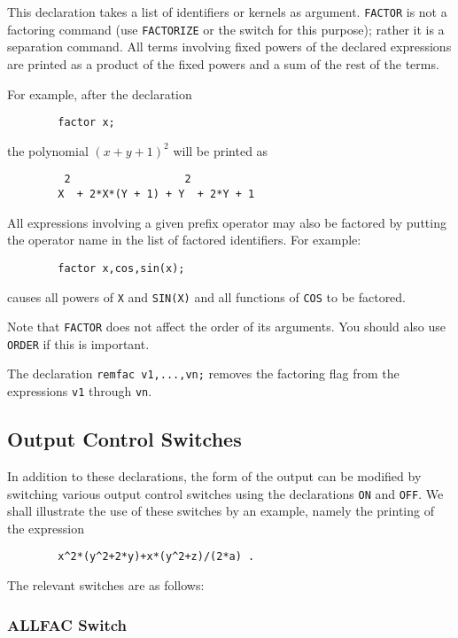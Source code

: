 This declaration takes a list of identifiers or kernels
as argument. \texttt{FACTOR} is not a factoring command
(use \texttt{FACTORIZE} or the  switch for this purpose); rather it
is a separation command.  All terms involving fixed powers of the declared
expressions are printed as a product of the fixed powers and a sum of the
rest of the terms.

For example, after the declaration
\begin{verbatim}
        factor x;
\end{verbatim}
the polynomial $(x+y+1)^{2}$ will be printed as
\begin{verbatim}
         2                  2
        X  + 2*X*(Y + 1) + Y  + 2*Y + 1
\end{verbatim}
All expressions involving a given prefix operator may also be factored by
putting the operator name in the list of factored identifiers. For example:
\begin{verbatim}
        factor x,cos,sin(x);
\end{verbatim}
causes all powers of \texttt{X} and \texttt{SIN(X)} and all functions of
\texttt{COS} to be factored.

Note that \texttt{FACTOR} does not affect the order of its arguments.  You
should also use \texttt{ORDER} if this is important.

\hypertarget{command:REMFAC}{}
The declaration \texttt{remfac v1,...,vn;} removes the
factoring flag from the expressions \texttt{v1} through \texttt{vn}.

\subsection{Output Control Switches}
\label{sec-output}
In addition to these declarations, the form of the output can be modified
by switching various output control switches using the declarations
\texttt{ON} and \texttt{OFF}.  We shall illustrate the use of these switches by an
example, namely the printing of the expression
\begin{verbatim}
        x^2*(y^2+2*y)+x*(y^2+z)/(2*a) .
\end{verbatim}
The relevant switches are as follows:

\subsubsection{ALLFAC Switch}
\hypertarget{switch:ALLFAC}{}

